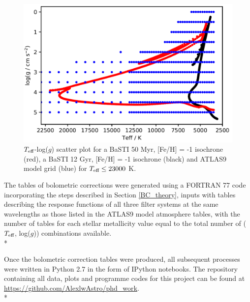 \documentclass[12pt, a4paper]{report}
\begin{document}
\begin{figure}[h]
\begin{center}
\includegraphics[scale=0.6]{ATLAS9_grid_BaSTI_coverage_2ages_crop.png}
\caption{$T_{\textnormal{eff}}$-log($g$) scatter plot for a BaSTI 50 Myr, [Fe/H] = -1 isochrone (red), a BaSTI 12 Gyr, [Fe/H] = -1 isochrone (black) and ATLAS9 model grid (blue) for $T_{\textnormal{eff}} \leq 23000$ K.}
\label{Teff-logg coverage}
\end{center}
\end{figure}

The tables of bolometric corrections were generated using a FORTRAN 77 code incorporating the steps described in Section \ref{BC_theory}, inputs with tables describing the response functions of all three filter systems at the same wavelengths as those listed in the ATLAS9 model atmosphere tables, with the number of tables for each stellar metallicity value equal to the total number of ($T_{\textnormal{eff}}$, log($g$)) combinations available.\\*

Once the bolometric correction tables were produced, all subsequent processes were written in Python 2.7 in the form of IPython notebooks. The repository containing all data, plots and programme codes for this project can be found at \protect\url{https://github.com/AlexlwAstro/phd_work}.\\*
\end{document}
